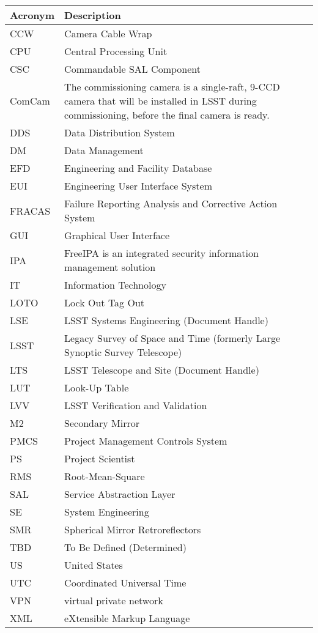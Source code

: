 \addtocounter{table}{-1}
\begin{longtable}{p{}p{}}\hline
\textbf{Acronym} & \textbf{Description}  \\\hline

CCW & Camera Cable Wrap \\\hline
CPU & Central Processing Unit \\\hline
CSC & Commandable SAL Component \\\hline
ComCam & The commissioning camera is a single-raft, 9-CCD camera that will be installed in LSST during commissioning, before the final camera is ready. \\\hline
DDS & Data Distribution System \\\hline
DM & Data Management \\\hline
EFD & Engineering and Facility Database \\\hline
EUI & Engineering User Interface System \\\hline
FRACAS & Failure Reporting Analysis and Corrective Action System \\\hline
GUI & Graphical User Interface \\\hline
IPA & FreeIPA is an integrated security information management solution \\\hline
IT & Information Technology \\\hline
LOTO & Lock Out Tag Out \\\hline
LSE & LSST Systems Engineering (Document Handle) \\\hline
LSST & Legacy Survey of Space and Time (formerly Large Synoptic Survey Telescope) \\\hline
LTS & LSST Telescope and Site (Document Handle) \\\hline
LUT & Look-Up Table \\\hline
LVV & LSST Verification and Validation \\\hline
M2 & Secondary Mirror \\\hline
PMCS & Project Management Controls System \\\hline
PS & Project Scientist \\\hline
RMS & Root-Mean-Square \\\hline
SAL & Service Abstraction Layer \\\hline
SE & System Engineering \\\hline
SMR & Spherical Mirror Retroreflectors \\\hline
TBD & To Be Defined (Determined) \\\hline
US & United States \\\hline
UTC & Coordinated Universal Time \\\hline
VPN & virtual private network \\\hline
XML & eXtensible Markup Language \\\hline
\end{longtable}
